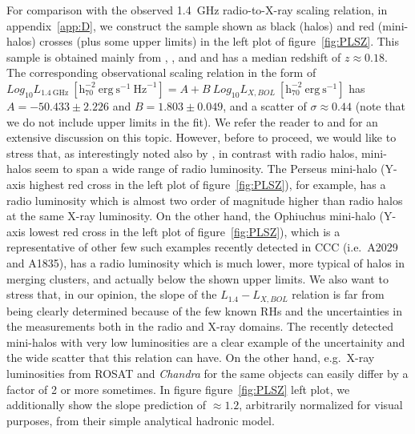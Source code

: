 \documentclass[traditabstract]{aa}
\newcommand{\rmn}{\mathrm}
\begin{document}
For comparison with the observed 1.4~GHz radio-to-X-ray scaling relation, in appendix~\ref{app:D}, we construct the sample shown as black (halos) and red (mini-halos) crosses (plus some upper limits) in the left plot of figure~\ref{fig:PLSZ}. This sample is obtained mainly from \cite{2009A&A...507..661B}, \cite{2011A&A...527A..99E},  and \cite{2009A&A...499..371G} and has a median redshift of $z\approx0.18$. The corresponding observational scaling relation in the form of $Log_{10} L_{1.4~\rmn{GHz}}~[\rmn{h}_{70}^{-2}~\rmn{erg}~\rmn{s}^{-1}~\rmn{Hz}^{-1}] = A + B~Log_{10} L_{X, BOL}~[\rmn{h}_{70}^{-2}~\rmn{erg}~\rmn{s}^{-1}]$ has $A=-50.433\pm2.226$ and $B=1.803\pm0.049$, and a scatter of $\sigma \approx 0.44$ (note that we do not include upper limits in the fit). We refer the reader to \cite{2009A&A...507..661B} and \cite{2011A&A...527A..99E} for an extensive discussion on this topic. However, before to proceed, we would like to stress that, as interestingly noted also by \cite{2009A&A...499..679M}, in contrast with radio halos, mini-halos seem to span a wide range of radio luminosity. The Perseus mini-halo (Y-axis highest red cross in the left plot of figure~\ref{fig:PLSZ}), for example, has a radio luminosity which is almost two order of magnitude higher than radio halos at the same X-ray luminosity. On the other hand, the Ophiuchus mini-halo (Y-axis lowest red cross in the left plot of figure~\ref{fig:PLSZ}), which is a representative of other few such examples recently detected in CCC (i.e.~A2029 and A1835), has a radio luminosity which is much lower, more typical of halos in merging clusters, and actually below the shown upper limits. We also want to stress that, in our opinion, the slope of the $L_{1.4}-L_{X, BOL}$ relation is far from being clearly determined because of the few known RHs and the uncertainties in the measurements both in the radio  and X-ray domains. The recently detected mini-halos with very low luminosities are a clear example of the uncertainity and the wide scatter that this relation can have. On the other hand, e.g.~X-ray luminosities from ROSAT and \emph{Chandra} for the same objects can easily differ by a factor of 2 or more sometimes. In figure figure~\ref{fig:PLSZ} left plot, we additionally show the \cite{2009JCAP...09..024K} slope prediction of $\approx1.2$, arbitrarily normalized for visual purposes, from their simple analytical hadronic model.
\end{document}
